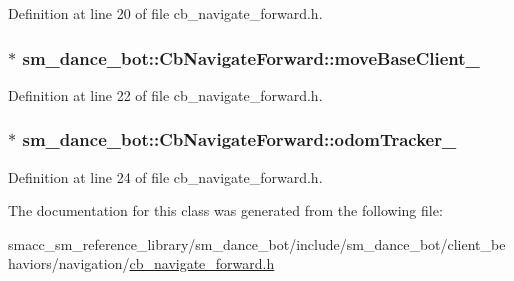 Definition at line 20 of file cb\+\_\+navigate\+\_\+forward.\+h.

\subsubsection[{\texorpdfstring{move\+Base\+Client\+\_\+}{moveBaseClient_}}]{$\ast$ sm\+\_\+dance\+\_\+bot\+::\+Cb\+Navigate\+Forward\+::move\+Base\+Client\+\_\+}\hypertarget{classsm__dance__bot_1_1CbNavigateForward_a5c07ee051da501dec97105fd66633259}{}\label{classsm__dance__bot_1_1CbNavigateForward_a5c07ee051da501dec97105fd66633259}


Definition at line 22 of file cb\+\_\+navigate\+\_\+forward.\+h.

\subsubsection[{\texorpdfstring{odom\+Tracker\+\_\+}{odomTracker_}}]{$\ast$ sm\+\_\+dance\+\_\+bot\+::\+Cb\+Navigate\+Forward\+::odom\+Tracker\+\_\+}\hypertarget{classsm__dance__bot_1_1CbNavigateForward_acaa4978c23fbc57fee5ee13a12842e7d}{}\label{classsm__dance__bot_1_1CbNavigateForward_acaa4978c23fbc57fee5ee13a12842e7d}


Definition at line 24 of file cb\+\_\+navigate\+\_\+forward.\+h.



The documentation for this class was generated from the following file\+:\begin{DoxyCompactItemize}
\item 
smacc\+\_\+sm\+\_\+reference\+\_\+library/sm\+\_\+dance\+\_\+bot/include/sm\+\_\+dance\+\_\+bot/client\+\_\+behaviors/navigation/\hyperlink{cb__navigate__forward_8h}{cb\+\_\+navigate\+\_\+forward.\+h}\end{DoxyCompactItemize}
